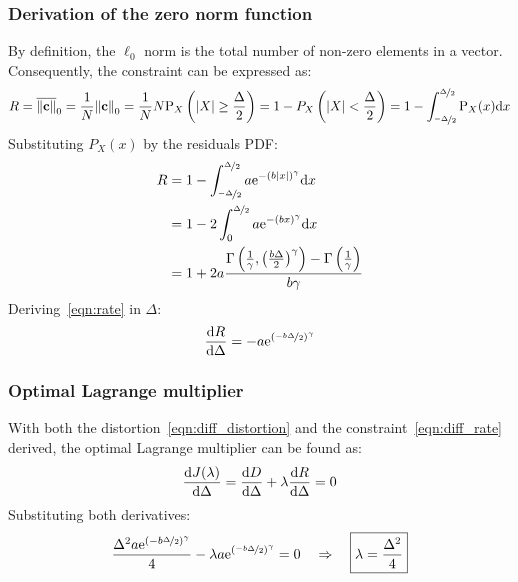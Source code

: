 \documentclass[11pt,a4paper,openright,twoside]{book}
\numberwithin{equation}{section} %
\numberwithin{figure}{section} %
\numberwithin{table}{section} %
\begin{document}
\subsubsection{Derivation of the zero norm function}
\label{ssub:derivation_of_the_zero_norm_function}

By definition, the $\ell_0$ norm is the total number of non-zero
elements in a vector.
Consequently, the constraint can be expressed as:
\begin{equation}
	R 
	= \overline{\Vert \mathbf{c} \Vert}_0 = \frac{1}{N}{\Vert \mathbf{c} \Vert}_0
	= \frac{1}{N} N \text{P}_X\left(\vert X \vert \ge \frac{\Delta}{2}\right)
	= 1-P_X\left(\vert X \vert < \frac{\Delta}{2}\right)
	= 1-\int_{\nicefrac{-\Delta}{2}}^{\nicefrac{\Delta}{2}}\text{P}_X(x)\text{d} x
	\label{eqn:int_rate}
\end{equation}
Substituting $P_X(x)$ by the residuals \ac{PDF}:
\begin{align}
	R
	&=1-\int_{\nicefrac{-\Delta}{2}}^{\nicefrac{\Delta}{2}}
	a \text{e}^{-{\left(b\vert x \vert\right)}^\gamma} \text{d} x \\
	&=1-2\int_0^{\nicefrac{\Delta}{2}}
	a \text{e}^{-{\left(b x \right)}^\gamma} \text{d} x \\
	&=1+2a\frac{\Gamma\left(
		\frac{1}{\gamma},{\left(\frac{b\Delta}{2}\right)}^\gamma\right)-
		\Gamma\left(\frac{1}{\gamma}\right)}
		{b\gamma}
	\label{eqn:rate}
\end{align}
Deriving~\eqref{eqn:rate} in $\Delta$:
\begin{equation}
	\frac{\text{d} R}{\text{d}\Delta} =
	-a\text{e}^{{\left(\nicefrac{-b\Delta}{2}\right)}^\gamma}
	\label{eqn:diff_rate}
\end{equation}
\subsubsection{Optimal Lagrange multiplier}
\label{ssub:optimal_lagrange_multiplier}

With both the distortion~\eqref{eqn:diff_distortion} and the
constraint~\eqref{eqn:diff_rate} derived, the optimal Lagrange
multiplier can be found as:
\begin{equation}
	\frac{\text{d} J(\lambda)}{\text{d} \Delta}
	= \frac{\text{d} D}{\text{d} \Delta} +
	\lambda \frac{\text{d} R}{\text{d} \Delta} = 0 \\
	\label{eqn:diff_lagrange_multiplier}
\end{equation}
Substituting both derivatives:
\begin{equation}
	\frac{\Delta^2 a \text{e}^{{(-b\nicefrac{\Delta}{2})}^\gamma}}{4}
	- \lambda
	a\text{e}^{{\left(\nicefrac{-b\Delta}{2}\right)}^\gamma} = 0
	\quad \Rightarrow \quad \boxed{\lambda = \frac{\Delta^2}{4}}
\end{equation}
\end{document}
